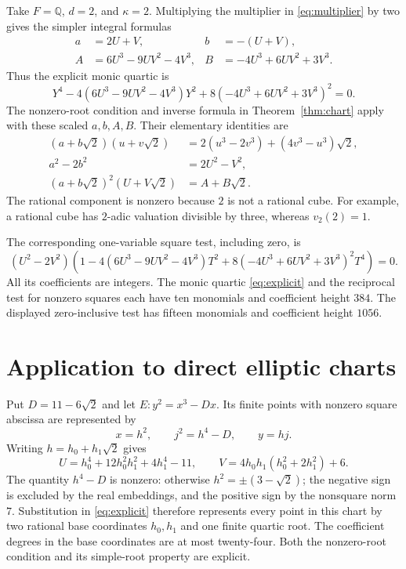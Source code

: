 \documentclass[11pt,a4paper]{article}
\newcommand{\Q}{\mathbb Q}
\begin{document}
Take $F=\Q$, $d=2$, and $\kappa=2$. Multiplying the multiplier
in \eqref{eq:multiplier} by two gives the simpler integral formulas
\begin{align*}
 a&=2U+V, &b&=-(U+V),\\
 A&=6U^3-9UV^2-4V^3,
 &B&=-4U^3+6UV^2+3V^3.
\end{align*}
Thus the explicit monic quartic is
\begin{equation}\label{eq:explicit}
 Y^4-4(6U^3-9UV^2-4V^3)Y^2
                   +8(-4U^3+6UV^2+3V^3)^2=0.
\end{equation}
The nonzero-root condition and inverse formula in
Theorem~\ref{thm:chart} apply with these scaled $a,b,A,B$.
Their elementary identities are
\begin{align*}
 (a+b\sqrt2)(u+v\sqrt2)
      &=2(u^3-2v^3)+(4v^3-u^3)\sqrt2,\\
 a^2-2b^2&=2U^2-V^2,\\
 (a+b\sqrt2)^2(U+V\sqrt2)&=A+B\sqrt2.
\end{align*}
The rational component is nonzero because $2$ is not a rational
cube. For example, a rational cube has $2$-adic valuation
divisible by three, whereas $v_2(2)=1$.

The corresponding one-variable square test, including zero, is
\[
 (U^2-2V^2)\left(1-4(6U^3-9UV^2-4V^3)T^2
                    +8(-4U^3+6UV^2+3V^3)^2T^4\right)=0.
\]
All its coefficients are integers.
The monic quartic \eqref{eq:explicit} and the reciprocal test
for nonzero squares each have ten monomials and coefficient
height $384$. The displayed zero-inclusive test has fifteen
monomials and coefficient height $1056$.

\section{Application to direct elliptic charts}

Put $D=11-6\sqrt2$ and let $E:y^2=x^3-Dx$. Its finite points
with nonzero square abscissa are represented by
\[
                x=h^2,\qquad j^2=h^4-D,\qquad y=hj.
\]
Writing $h=h_0+h_1\sqrt2$ gives
\[
 U=h_0^4+12h_0^2h_1^2+4h_1^4-11,\qquad
 V=4h_0h_1(h_0^2+2h_1^2)+6.
\]
The quantity $h^4-D$ is nonzero: otherwise $h^2=\pm(3-\sqrt2)$;
the negative sign is excluded by the real embeddings, and the
positive sign by the nonsquare norm $7$.
Substitution in \eqref{eq:explicit} therefore represents every
point in this chart by two rational base coordinates $h_0,h_1$
and one finite quartic root. The coefficient degrees in the base
coordinates are at most twenty-four. Both the nonzero-root
condition and its simple-root property are explicit.
\end{document}
